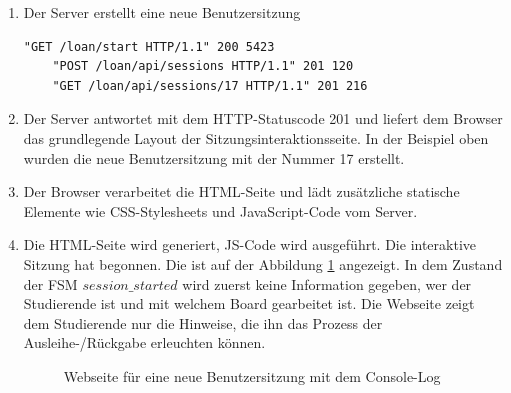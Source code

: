 \begin{enumerate}
	\item Der Server erstellt eine neue Benutzersitzung
	\begin{lstlisting}[caption={[HTTP-Statuscodes für die neue Sitzung] },captionpos=b]
	"GET /loan/start HTTP/1.1" 200 5423
	"POST /loan/api/sessions HTTP/1.1" 201 120
	"GET /loan/api/sessions/17 HTTP/1.1" 201 216
	\end{lstlisting}
\item Der Server antwortet mit dem HTTP-Statuscode 201 und liefert dem Browser das grundlegende Layout der Sitzungsinteraktionsseite. In der Beispiel oben wurden die neue Benutzersitzung mit der Nummer 17 erstellt.
\item Der Browser verarbeitet die HTML-Seite und lädt zusätzliche statische Elemente wie CSS-Stylesheets und JavaScript-Code vom Server.
\item Die HTML-Seite wird generiert, JS-Code wird ausgeführt. Die interaktive Sitzung hat begonnen. Die ist auf der Abbildung \ref{fig:web01} angezeigt. In dem Zustand der FSM $session\_started$ wird zuerst keine Information gegeben, wer der Studierende ist und mit welchem Board gearbeitet ist. Die Webseite zeigt dem Studierende nur die Hinweise, die ihn das Prozess der Ausleihe-/Rückgabe erleuchten können. 
\begin{figure}[h!]
	\centering
	\caption{Webseite für eine neue Benutzersitzung mit dem Console-Log}
	\label{fig:web01}
\end{figure}
\end{enumerate}


